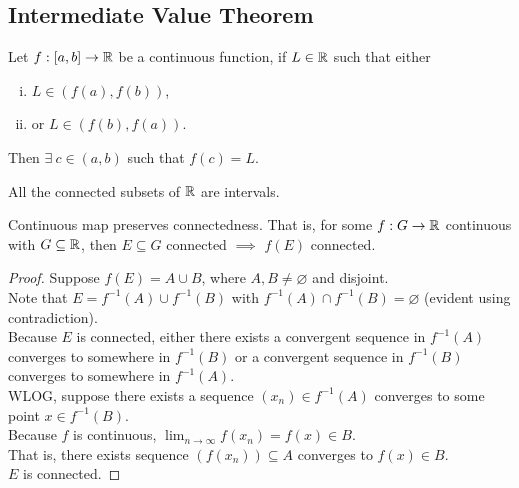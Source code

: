 \documentclass[11pt]{article}
\begin{document}
	\subsection{Intermediate Value Theorem}
	\begin{theorem}
		Let $f: [a, b] \to \mathbb{R}$ be a continuous function, if $L \in \mathbb{R}$ such that either
		\begin{enumerate}[(i)]
			\item $L \in (f(a), f(b))$,
			\item or $L \in (f(b), f(a))$.
		\end{enumerate}
		Then $\exists\ c \in (a, b)$ such that $f(c) = L$.
	\end{theorem}
	
	\begin{lemma}
		All the connected subsets of $\mathbb{R}$ are intervals.
	\end{lemma}
	
	\begin{theorem}
		Continuous map preserves connectedness. That is, for some $f: G \to \mathbb{R}$ continuous with $G \subseteq \mathbb{R}$, then $E \subseteq G$ connected $\implies$ $f(E)$ connected.
	\end{theorem}
	
	\begin{proof}
		Suppose $f(E) = A \cup B$, where $A, B \neq \varnothing$ and disjoint. \\
		Note that $E = f^{-1}(A) \cup f^{-1}(B)$ with $f^{-1}(A) \cap f^{-1}(B) = \varnothing$ (evident using contradiction). \\
		Because $E$ is connected, either there exists a convergent sequence in $f^{-1}(A)$ converges to somewhere in $f^{-1}(B)$ or a convergent sequence in $f^{-1}(B)$ converges to somewhere in $f^{-1}(A)$. \\
		WLOG, suppose there exists a sequence $(x_n) \in f^{-1}(A)$ converges to some point $x \in f^{-1}(B)$. \\
		Because $f$ is continuous, $\lim_{n \to \infty} f(x_n) = f(x) \in B$. \\
		That is, there exists sequence $(f(x_n)) \subseteq A$ converges to $f(x) \in B$. \\
		$E$ is connected.
	\end{proof}
	
\end{document}
